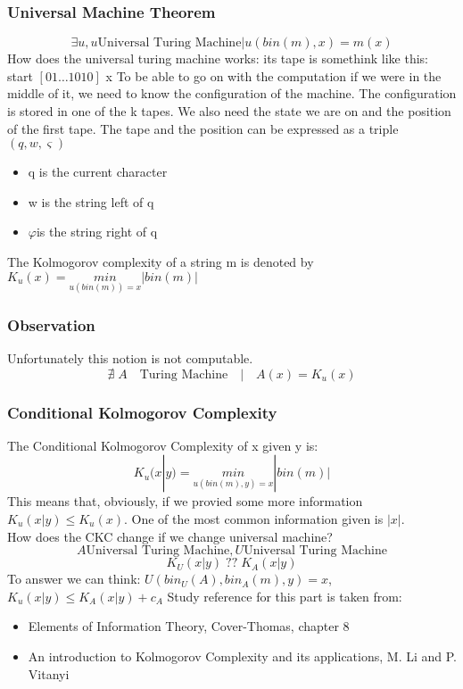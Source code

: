     \subsubsection*{Universal Machine Theorem}
    $$\exists u, u \text{Universal Turing Machine} | u(bin(m), x) = m(x)$$
    How does the universal turing machine works:
    its tape is somethink like this: start $ \left[ 01\ldots 1010 \right] $ x
    To be able to go on with the computation if we were in the middle of it, we need to know the configuration of the machine.
    The configuration is stored in one of the k tapes. We also need the state we are on and the position of the first tape.
    The tape and the position can be expressed as a triple $(q, w, \varsigma)$
    \begin{itemize}
        \item q is the current character
        \item w is the string left of q
        \item $\varphi $is the string right of q
    \end{itemize}
    The Kolmogorov complexity of a string m is denoted by $K_u(x) = \underset{u(bin(m))=x}{min}|bin(m)|$
    \subsubsection*{Observation}
    Unfortunately this notion is not computable. $$
    \nexists\; A\quad \text{Turing Machine} \quad|\quad A(x) = K_u(x)$$
    \subsubsection*{Conditional Kolmogorov Complexity}
    The Conditional Kolmogorov Complexity of x given y is:
    $$ K_u(x|y) = \underset{u(bin(m),y)=x}{min} |bin(m)| $$
    This means that, obviously, if we provied some more information $K_u(x|y) \leq K_u(x)$. One of the most common information given is $|x|$.\\
    How does the CKC change if we change universal machine?
    $$A \text{Universal Turing Machine}, U \text{Universal Turing Machine}$$
    $$K_U(x|y)\;?? \; K_A(x|y)$$
    To answer we can think:
    $U(bin_U(A), bin_A(m),y)=x$, $K_u(x|y) \leq K_A(x|y)+c_A$
    Study reference for this part is taken from: 
    \begin{itemize}
        \item Elements of Information Theory, Cover-Thomas, chapter 8
        \item An introduction to Kolmogorov Complexity and its applications, M. Li and P. Vitanyi
    \end{itemize}
